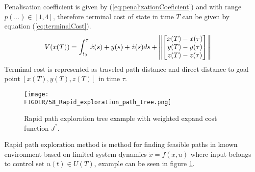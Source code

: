 Penalisation coefficient is given by (\ref{eq:penalizationCoeficient}) and with range $p(\dots)\in [1,4]$, therefore terminal cost of state in time $T$ can be given by equation (\ref{eq:terminalCost}).
\begin{equation}\label{eq:terminalCost}
    V(x(T)) = \int_{t_0}^\tau \dot{x}(s) +\dot{y}(s)+\dot{z}(s) ds + \left\lVert\begin{bmatrix}x(T)-x(\tau)\\y(T)-y(\tau)\\z(T)-z(\tau)\\ \end{bmatrix}\right\rVert
\end{equation}
Terminal cost is represented as traveled path distance and direct distance to goal point $[x(T),y(T),z(T)]$ in time $\tau$.
\begin{figure}[H]
    \centering
    \texttt{[image: \\FIGDIR/58\_Rapid\_exploration\_path\_tree.png]}
    \caption{Rapid path exploration tree example with weighted expand cost function $J^*$.}
    \label{fig:58rapidPathExploaation}
\end{figure}
\noindent Rapid path exploration method is method for finding feasible paths in known environment based on limited system dynamics $\dot{x}=f(x,u)$ where input belongs to control  set $u(t)\in U(T)$, example can be seen in figure \ref{fig:58rapidPathExploaation}.

